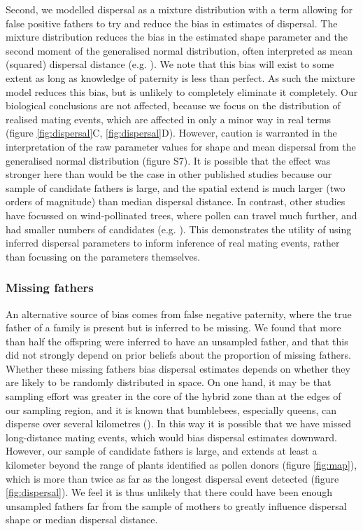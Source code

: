 \documentclass[10pt, a4paper, twocolumn]{article} %
\begin{document}
Second, we modelled dispersal as a mixture distribution with a term allowing for false positive fathers to try and reduce the bias in estimates of dispersal.
The mixture distribution reduces the bias in the estimated shape parameter and the second moment of the generalised normal distribution, often interpreted as mean (squared) dispersal distance (e.g. \cite{clark1998trees, austerlitz2004using, klein2008pollen}).
We note that this bias will exist to some extent as long as knowledge of paternity is less than perfect.
As such the mixture model reduces this bias, but is unlikely to completely eliminate it completely.
Our biological conclusions are not affected, because we focus on the distribution of realised mating events, which are affected in only a minor way in real terms (figure \ref{fig:dispersal}C, \ref{fig:dispersal}D).
However, caution is warranted in the interpretation of the raw parameter values for shape and mean dispersal from the generalised normal distribution (figure S7).
It is possible that the effect was stronger here than would be the case in other published studies because our sample of candidate fathers is large, and the spatial extend is much larger (two orders of magnitude) than median dispersal distance.
In contrast, other studies have focussed on wind-pollinated trees, where pollen can travel much further, and had smaller numbers of candidates (e.g. \cite{adams1992using, austerlitz2004using, klein2008pollen}).
This demonstrates the utility of using inferred dispersal parameters to inform inference of real mating events, rather than focussing on the parameters themselves.

\subsubsection{Missing fathers}

An alternative source of bias comes from false negative paternity, where the true father of a family is present but is inferred to be missing.
We found that more than half the offspring were inferred to have an unsampled father, and that this did not strongly depend on prior beliefs about the proportion of missing fathers.
Whether these missing fathers bias dispersal estimates depends on whether they are likely to be randomly distributed in space.
On one hand, it may be that sampling effort was greater in the core of the hybrid zone than at the edges of our sampling region, and it is known that bumblebees, especially queens, can disperse over several kilometres (\cite{osborne2008bumblebee, hagen2011space, lepais2010estimation}).
In this way it is possible that we have missed long-distance mating events, which would bias dispersal estimates downward.
However, our sample of candidate fathers is large, and extends at least a kilometer beyond the range of plants identified as pollen donors (figure \ref{fig:map}), which is more than twice as far as the longest dispersal event detected (figure \ref{fig:dispersal}).
We feel it is thus unlikely that there could have been enough unsampled fathers far from the sample of mothers to greatly influence dispersal shape or median dispersal distance.
\end{document}
